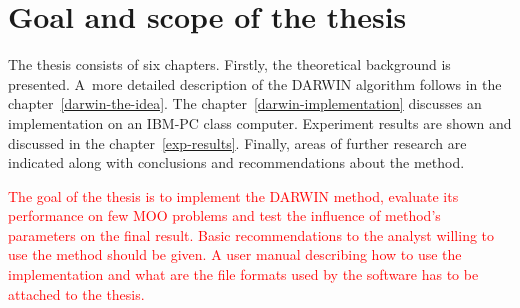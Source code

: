 \section{Goal and scope of the thesis}

The thesis consists of six chapters. Firstly, the theoretical background is
presented. A~more detailed description of the DARWIN algorithm follows in the
chapter~\ref{darwin-the-idea}. The chapter~\ref{darwin-implementation}
discusses an implementation on an IBM-PC class computer. Experiment results
are shown and discussed in the chapter~\ref{exp-results}. Finally, areas of
further research are indicated along with conclusions and recommendations
about the method.

\textcolor{red}{The goal of the thesis is to implement the DARWIN method,
  evaluate its performance on few MOO problems and test the influence of
  method's parameters on the final result.  Basic recommendations to the
  analyst willing to use the method should be given. A user manual describing
  how to use the implementation and what are the file formats used by the
  software has to be attached to the thesis.}

